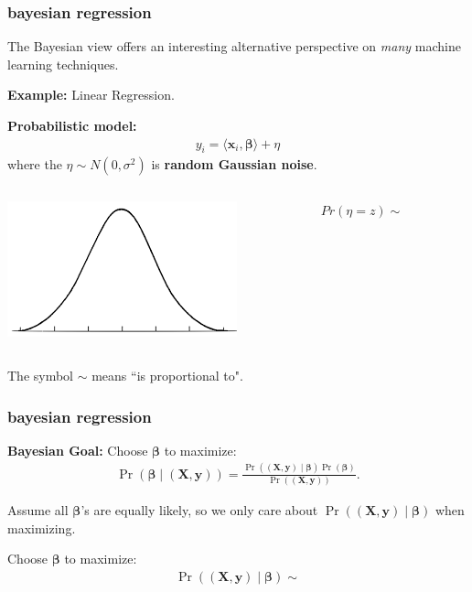 \documentclass[handout,compress]{beamer}
\newcommand{\bs}[1]{\boldsymbol{#1}}
\newcommand{\bv}[1]{\mathbf{#1}}
\begin{document}
\begin{frame}
	\frametitle{bayesian regression}
	The Bayesian view offers an interesting alternative perspective on \emph{many} machine learning techniques. 
	
	\vspace{2em}
	\textbf{Example:} Linear Regression. 
	
	\textbf{Probabilistic model:}
	\begin{align*}
	 	y_i = \langle \bv{x}_i, \bs{\beta} \rangle+ \eta
	\end{align*}
	where the $\eta \sim N(0,\sigma^2)$ is \textbf{random Gaussian noise}.
	\vspace{.5em}
	\begin{columns}
		\begin{column}{.5\textwidth}
				\hspace{2em}\includegraphics[width=.7\textwidth]{bell.png}
		\end{column}
		\begin{column}{.5\textwidth}
				$Pr(\eta = z) \sim$
		\end{column}
	\end{columns}
The symbol $\sim$ means ``is proportional to". 
\end{frame}

\begin{frame}
	\frametitle{bayesian regression}
		\textbf{Bayesian Goal:} Choose $\bs{\beta}$ to  maximize:
		\begin{align*}
		\Pr(\bs{\beta} \mid (\bv{X},\bv{y}) )  = \frac{\Pr((\bv{X},\bv{y}) \mid  \bs{\beta} ) \Pr(\bs{\beta} )  }{\Pr((\bv{X},\bv{y}) )}.
		\end{align*}
		
		Assume all $\bs{\beta}$'s are equally likely, so we only care about $\Pr((\bv{X},\bv{y}) \mid  \bs{\beta} )$  when maximizing.
		
		Choose $\bs{\beta}$ to  maximize:
		\begin{align*}
		\Pr((\bv{X},\bv{y})  \mid  \bs{\beta} ) \sim 
		\end{align*}
		
\end{frame}
\end{document}
